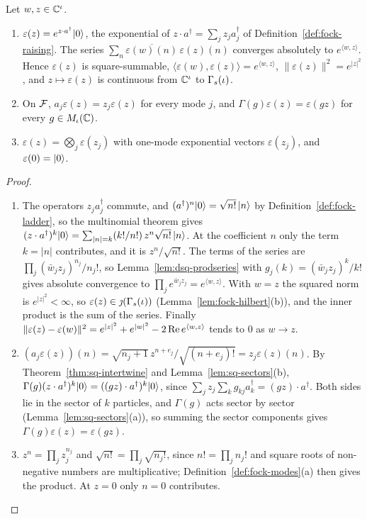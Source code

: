\begin{veteenv}
\begin{lemma}\label{lem:dsq-expvec}
Let $w,z\in\mathbb C^\iota$.
\begin{enumerate}
\item[(a)] $\varepsilon(z)=e^{z\cdot a^\dagger}\lvert 0\rangle$, the exponential of $z\cdot a^\dagger=\sum_jz_ja_j^\dagger$ of
Definition~\ref{def:fock-raising}. The series $\sum_n\overline{\varepsilon(w)(n)}\,\varepsilon(z)(n)$ converges absolutely to
$e^{\langle w,z\rangle}$. Hence $\varepsilon(z)$ is square-summable, $\langle\varepsilon(w),\varepsilon(z)\rangle=e^{\langle
w,z\rangle}$, $\lVert\varepsilon(z)\rVert^2=e^{\lvert z\rvert^2}$, and $z\mapsto\varepsilon(z)$ is continuous from $\mathbb C^\iota$ to
$\Gamma_s(\iota)$.
\item[(b)] On $\mathcal F$, $a_j\varepsilon(z)=z_j\varepsilon(z)$ for every mode $j$, and $\Gamma(g)\varepsilon(z)=\varepsilon(gz)$
for every $g\in M_\iota(\mathbb C)$.
\item[(c)] $\varepsilon(z)=\bigotimes_j\varepsilon(z_j)$ with one-mode exponential vectors $\varepsilon(z_j)$, and
$\varepsilon(0)=\lvert 0\rangle$.
\end{enumerate}
\end{lemma}

\begin{proof}
\begin{enumerate}
\item[(a)] The operators $z_ja_j^\dagger$ commute, and $(a^\dagger)^n\lvert 0\rangle=\sqrt{n!}\,\lvert n\rangle$ by
Definition~\ref{def:fock-ladder}, so the multinomial theorem gives $(z\cdot a^\dagger)^k\lvert 0\rangle=\sum_{\lvert
n\rvert=k}(k!/n!)\,z^n\sqrt{n!}\,\lvert n\rangle$. At the coefficient $n$ only the term $k=\lvert n\rvert$ contributes, and it is
$z^n/\sqrt{n!}$. The terms of the series are $\prod_j(\bar w_jz_j)^{n_j}/n_j!$, so Lemma~\ref{lem:dsq-prodseries} with
$g_j(k)=(\bar w_jz_j)^k/k!$ gives absolute convergence to $\prod_je^{\bar w_jz_j}=e^{\langle w,z\rangle}$. With $w=z$ the
squared norm is $e^{\lvert z\rvert^2}<\infty$, so $\varepsilon(z)\in\jmath(\Gamma_s(\iota))$ (Lemma~\ref{lem:fock-hilbert}(b)), and the
inner product is the sum of the series. Finally
$\lVert\varepsilon(z)-\varepsilon(w)\rVert^2=e^{\lvert z\rvert^2}+e^{\lvert w\rvert^2}-2\operatorname{Re} e^{\langle w,z\rangle}$ tends to
$0$ as $w\to z$.
\item[(b)] $(a_j\varepsilon(z))(n)=\sqrt{n_j+1}\,z^{n+e_j}/\sqrt{(n+e_j)!}=z_j\varepsilon(z)(n)$. By
Theorem~\ref{thm:sq-intertwine} and Lemma~\ref{lem:sq-sectors}(b), $\Gamma(g)(z\cdot a^\dagger)^k\lvert 0\rangle=((gz)\cdot
a^\dagger)^k\lvert 0\rangle$, since $\sum_jz_j\sum_kg_{kj}a_k^\dagger=(gz)\cdot a^\dagger$. Both sides lie in the sector of $k$
particles, and $\Gamma(g)$ acts sector by sector (Lemma~\ref{lem:sq-sectors}(a)), so summing the sector components gives
$\Gamma(g)\varepsilon(z)=\varepsilon(gz)$.
\item[(c)] $z^n=\prod_jz_j^{n_j}$ and $\sqrt{n!}=\prod_j\sqrt{n_j!}$, since $n!=\prod_jn_j!$ and square roots of non-negative
numbers are multiplicative; Definition~\ref{def:fock-modes}(a) then gives the product. At $z=0$ only $n=0$
contributes.\qedhere
\end{enumerate}
\end{proof}


\end{veteenv}

